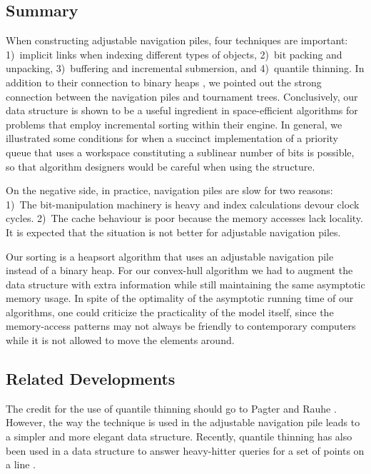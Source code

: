 \documentclass[final,onetabnum,onefignum,onethmnum]{siamltex}
\begin{document}
\subsection{Summary} 

When constructing adjustable navigation piles, four techniques
are important: 1)~implicit links when indexing different types of
objects, 2)~bit packing and unpacking, 3)~buffering and incremental
submersion, and 4)~quantile thinning.  In addition to their connection
to binary heaps \cite{Wil64}, we pointed out the strong connection 
between the navigation piles and tournament trees.  
Conclusively, our data structure is shown to be a useful ingredient in space-efficient algorithms 
for problems that employ incremental sorting within their engine.
In general, we illustrated some conditions for when a succinct
implementation of a priority queue that uses a workspace constituting a sublinear number of bits is possible,
so that algorithm designers would be careful when using the structure.  

On the negative side, in practice, navigation piles are slow
\cite{JK06} for two reasons: 1)~The bit-manipulation machinery is
heavy and index calculations devour clock cycles. 2)~The cache
behaviour is poor because the memory accesses lack locality.
It is expected that the situation is not better for adjustable navigation piles.


Our sorting is a heapsort algorithm \cite{Wil64} that uses
an adjustable navigation pile instead of a binary heap.  For our
convex-hull algorithm we had to augment the data structure with extra
information while still maintaining the same asymptotic memory usage.
In spite of the optimality of the asymptotic running time of our
algorithms, one could criticize the practicality of the model itself, since the
memory-access patterns may not always be friendly to contemporary
computers while it is not allowed to move the elements around.

\subsection{Related Developments}
The credit for the use of quantile thinning should go to Pagter and
Rauhe \cite{PR98}.  However, the way the technique is used in the
adjustable navigation pile leads to a simpler and more elegant data
structure.  Recently, quantile thinning has also been used in a data
structure to answer heavy-hitter queries for a set of points on a line
\cite{EHMN11}.
\end{document}
